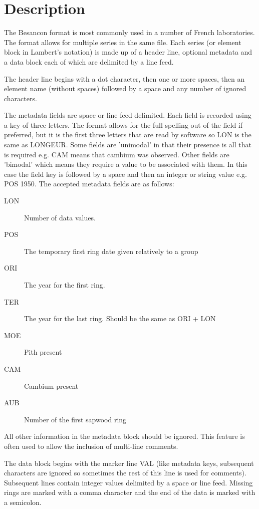 \section{Description}

The Besancon format is most commonly used in a number of French laboratories. The format allows for multiple series in the same file. Each series (or element block in Lambert's notation) is made up of a header line, optional metadata and a data block each of which are delimited by a line feed. 

\begin{itemize*}
    \item The header line begins with a dot character, then one or more spaces, then an element name (without spaces) followed by a space and any number of ignored characters.
    \item The metadata fields are space or line feed delimited. Each field is recorded using a key of three letters. The format allows for the full spelling out of the field if preferred, but it is the first three letters that are read by software so LON is the same as LONGEUR. Some fields are 'unimodal' in that their presence is all that is required e.g. CAM means that cambium was observed. Other fields are 'bimodal' which means they require a value to be associated with them. In this case the field key is followed by a space and then an integer or string value e.g. POS 1950. The accepted metadata fields are as follows:
    \begin{description}
          \item[LON] Number of data values.
          \item[POS] The temporary first ring date given relatively to a group
          \item[ORI] The year for the first ring.
          \item[TER] The year for the last ring. Should be the same as ORI + LON
          \item[MOE] Pith present
          \item[CAM] Cambium present
          \item[AUB] Number of the first sapwood ring 
    \end{description}   
    All other information in the metadata block should be ignored. This feature is often used to allow the inclusion of multi-line comments. 
    \item The data block begins with the marker line VAL (like metadata keys, subsequent characters are ignored so sometimes the rest of this line is used for comments). Subsequent lines contain integer values delimited by a space or line feed. Missing rings are marked with a comma character and the end of the data is marked with a semicolon. 
\end{itemize*}

